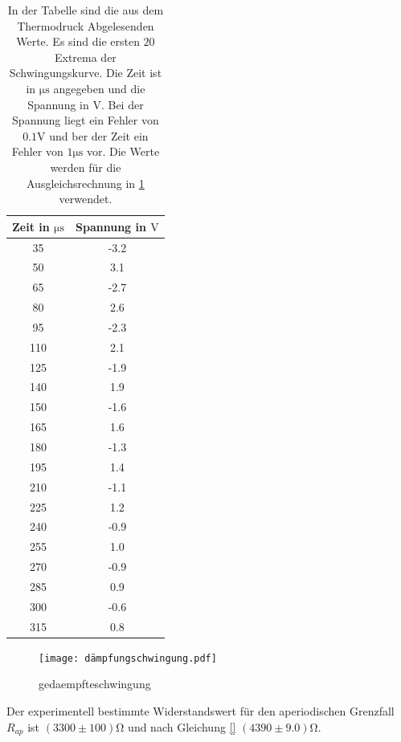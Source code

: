 \begin{table}
  \centering
  \begin{tabular}{c c}
    \toprule
    Zeit in $\si{\micro\second}$ & Spannung in $\si{\volt}$  \\
    \midrule
     35  &  -3.2  \\
     50  &   3.1  \\
     65  &  -2.7  \\
     80  &   2.6  \\
     95  &  -2.3  \\
    110  &   2.1  \\
    125  &  -1.9  \\
    140  &   1.9  \\
    150  &  -1.6  \\
    165  &   1.6  \\
    180  &  -1.3  \\
    195  &   1.4  \\
    210  &  -1.1  \\
    225  &   1.2  \\
    240  &  -0.9  \\
    255  &   1.0  \\
    270  &  -0.9  \\
    285  &   0.9  \\
    300  &  -0.6  \\
    315  &   0.8  \\
    \bottomrule
  \end{tabular}
  \caption{In der Tabelle sind die aus dem Thermodruck Abgelesenden Werte.
           Es sind die ersten $20$ Extrema der Schwingungskurve. Die Zeit ist
            in  $\si{\micro\second}$ angegeben und die Spannung in $\si{\volt}$.
            Bei der Spannung liegt ein Fehler von $0.1\si{\volt}$ und ber der Zeit
            ein Fehler von $1\si{\micro\second}$ vor.
           Die Werte werden für die Ausgleichsrechnung in \ref{fig:gedaempfteschwingung}
           verwendet.}
\end{table}
\begin{figure}
  \centering
  \texttt{[image: dämpfungschwingung.pdf]}
  \caption{gedaempfteschwingung}
  \label{fig:gedaempfteschwingung}
\end{figure}

Der experimentell bestimmte Widerstandswert für den aperiodischen Grenzfall
$R_{ap}$ ist $(3300\pm100)\si{\ohm}$ und  nach Gleichung \eqref{}
 $(4390\pm9.0)\si{\ohm}$.

